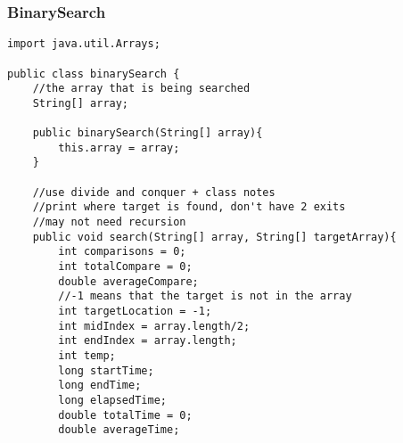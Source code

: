 \documentclass[10pt]{article}
\begin{document}
\subsubsection{BinarySearch}
\lstset{numbers=left, numberstyle=\tiny, stepnumber=1, numbersep=5pt, basicstyle=\footnotesize\ttfamily}
\begin{lstlisting}[frame=single, ]  
import java.util.Arrays;

public class binarySearch {
    //the array that is being searched
    String[] array;

    public binarySearch(String[] array){
        this.array = array;
    }

    //use divide and conquer + class notes
    //print where target is found, don't have 2 exits
    //may not need recursion
    public void search(String[] array, String[] targetArray){
        int comparisons = 0;
        int totalCompare = 0;
        double averageCompare;
        //-1 means that the target is not in the array
        int targetLocation = -1;
        int midIndex = array.length/2;
        int endIndex = array.length;
        int temp;
        long startTime;
        long endTime;
        long elapsedTime;
        double totalTime = 0;
        double averageTime;


\end{lstlisting}
\end{document}

